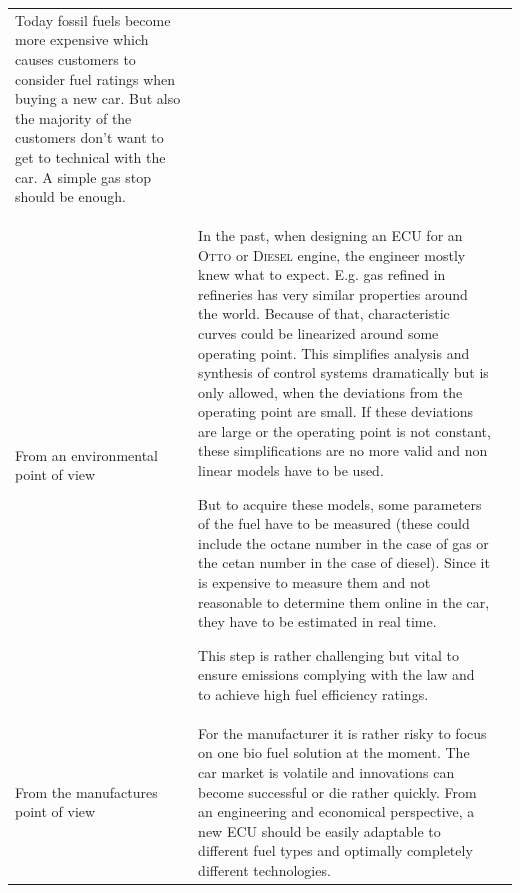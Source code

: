 \begin{xtabular}{|p{3.8cm}|p{8.3cm}|p{4.2cm}|}
	Today fossil fuels become more expensive which causes customers to consider fuel ratings when buying a new car. But also the majority of the customers don't want to get to technical with the car. A simple gas stop should be enough.
	&
	
	\\
	From an environmental point of view
	&
	In the past, when designing an ECU for an \textsc{Otto} or \textsc{Diesel} engine, the engineer mostly knew what to expect. E.g. gas refined in refineries has very similar properties around the world. Because of that, characteristic curves could be linearized around some operating point. This simplifies analysis and synthesis of control systems dramatically but is only allowed, when the deviations from the operating point are small. If these deviations are large or the operating point is not constant, these simplifications are no more valid and non linear models have to be used.
	
	But to acquire these models, some parameters of the fuel have to be measured (these could include the octane number in the case of gas or the cetan number in the case of diesel). Since it is expensive to measure them and not reasonable to determine them online in the car, they have to be estimated in real time.
	
	This step is rather challenging but vital to ensure emissions complying with the law and to achieve high fuel efficiency ratings.
	&
	\\
	From the manufactures point of view
	&
	For the manufacturer it is rather risky to focus on one bio fuel solution at the moment. The car market is volatile and innovations can become successful or die rather quickly. From an engineering and economical perspective, a new ECU should be easily adaptable to different fuel types and optimally completely different technologies.
	&
	

\end{xtabular}
